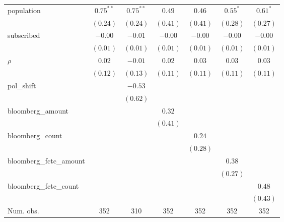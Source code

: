 \begin{table}[!h]
\begin{center}
\begin{tabular}{l c c c c c c }
population              & $0.75^{**}$  & $0.75^{**}$  & $0.49$       & $0.46$       & $0.55^{*}$   & $0.61^{*}$   \\
                        & $(0.24)$     & $(0.24)$     & $(0.41)$     & $(0.41)$     & $(0.28)$     & $(0.27)$     \\
subscribed              & $-0.00$      & $-0.01$      & $-0.00$      & $-0.00$      & $-0.00$      & $-0.00$      \\
                        & $(0.01)$     & $(0.01)$     & $(0.01)$     & $(0.01)$     & $(0.01)$     & $(0.01)$     \\
$\rho$                  & $0.02$       & $-0.01$      & $0.02$       & $0.03$       & $0.03$       & $0.03$       \\
                        & $(0.12)$     & $(0.13)$     & $(0.11)$     & $(0.11)$     & $(0.11)$     & $(0.11)$     \\
pol\_shift              &              & $-0.53$      &              &              &              &              \\
                        &              & $(0.62)$     &              &              &              &              \\
bloomberg\_amount       &              &              & $0.32$       &              &              &              \\
                        &              &              & $(0.41)$     &              &              &              \\
bloomberg\_count        &              &              &              & $0.24$       &              &              \\
                        &              &              &              & $(0.28)$     &              &              \\
bloomberg\_fctc\_amount &              &              &              &              & $0.38$       &              \\
                        &              &              &              &              & $(0.27)$     &              \\
bloomberg\_fctc\_count  &              &              &              &              &              & $0.48$       \\
                        &              &              &              &              &              & $(0.43)$     \\
\midrule
Num. obs.               & 352          & 310          & 352          & 352          & 352          & 352          \\

\end{tabular}
\end{center}
\end{table}
